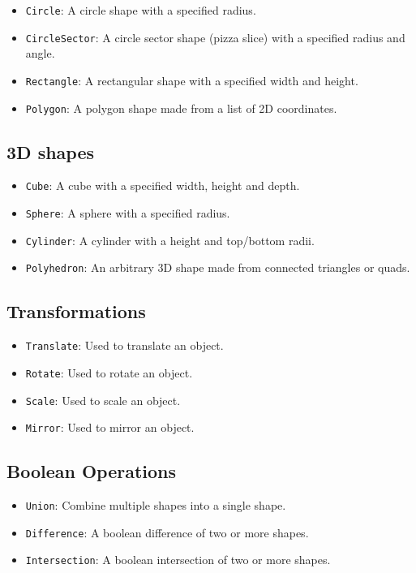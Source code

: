 \begin{itemize}
	\item \texttt{Circle}: A circle shape with a specified radius.
	\item \texttt{CircleSector}: A circle sector shape (pizza slice) with a
		specified radius and angle.
	\item \texttt{Rectangle}: A rectangular shape with a specified width and
		height.
	\item \texttt{Polygon}: A polygon shape made from a list of 2D coordinates.
\end{itemize}

\subsection{3D shapes}

\begin{itemize}
	\item \texttt{Cube}: A cube with a specified width, height and depth.
	\item \texttt{Sphere}: A sphere with a specified radius.
	\item \texttt{Cylinder}: A cylinder with a height and top/bottom radii.
	\item \texttt{Polyhedron}: An arbitrary 3D shape made from connected triangles
		or quads.
\end{itemize}

\subsection{Transformations}

\begin{itemize}
	\item \texttt{Translate}: Used to translate an object.
	\item \texttt{Rotate}: Used to rotate an object.
	\item \texttt{Scale}: Used to scale an object.
	\item \texttt{Mirror}: Used to mirror an object.
\end{itemize}

\subsection{Boolean Operations}

\begin{itemize}
	\item \texttt{Union}: Combine multiple shapes into a single shape.
	\item \texttt{Difference}: A boolean difference of two or more shapes.
	\item \texttt{Intersection}: A boolean intersection of two or more shapes.
\end{itemize}

